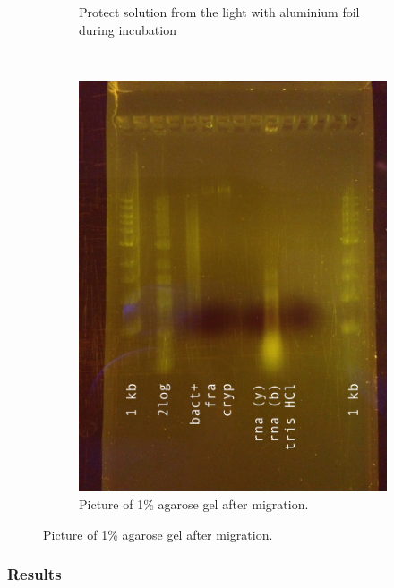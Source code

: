 \begin{figure}[H]
\begin{subfigure}[b]{0.37\textwidth}
        \caption{Protect solution from the light with aluminium foil during incubation}
        \label{sfig:20180315_sybr_gold_incubation}
    \end{subfigure}
    ~ 
    \begin{subfigure}[b]{0.208\textwidth}
        \includegraphics[width=\textwidth]{graphics/pic/20180315_gel_sybr_gold.JPG}
        \caption{Picture of 1\% agarose gel after migration.}
        \label{sfig:20180315_gel_sybr_gold}
    \end{subfigure}
\end{figure}

\subsubsection{Results}

